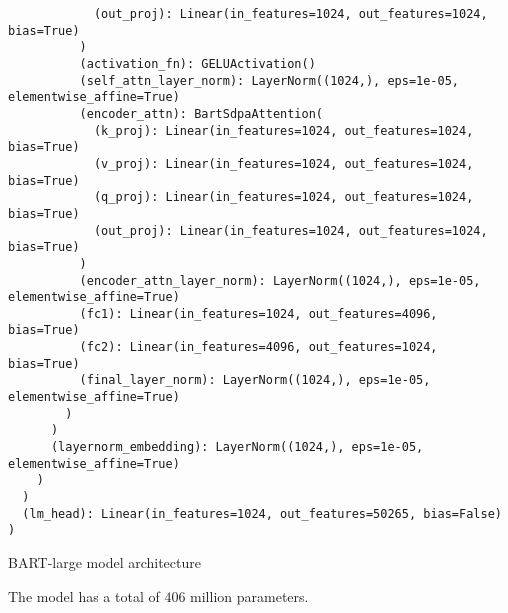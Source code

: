 \begin{listing}[H]
\begin{verbatim}
            (out_proj): Linear(in_features=1024, out_features=1024, bias=True)
          )
          (activation_fn): GELUActivation()
          (self_attn_layer_norm): LayerNorm((1024,), eps=1e-05, elementwise_affine=True)
          (encoder_attn): BartSdpaAttention(
            (k_proj): Linear(in_features=1024, out_features=1024, bias=True)
            (v_proj): Linear(in_features=1024, out_features=1024, bias=True)
            (q_proj): Linear(in_features=1024, out_features=1024, bias=True)
            (out_proj): Linear(in_features=1024, out_features=1024, bias=True)
          )
          (encoder_attn_layer_norm): LayerNorm((1024,), eps=1e-05, elementwise_affine=True)
          (fc1): Linear(in_features=1024, out_features=4096, bias=True)
          (fc2): Linear(in_features=4096, out_features=1024, bias=True)
          (final_layer_norm): LayerNorm((1024,), eps=1e-05, elementwise_affine=True)
        )
      )
      (layernorm_embedding): LayerNorm((1024,), eps=1e-05, elementwise_affine=True)
    )
  )
  (lm_head): Linear(in_features=1024, out_features=50265, bias=False)
)
                \end{verbatim}
                \caption{BART-large model architecture}
                \label{lst:bart_large_architecture}
            \end{listing}
    The model has a total of \(406\) million parameters.
